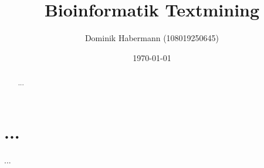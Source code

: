 \documentclass[a4paper,10pt]{article}
\title{Bioinformatik Textmining}
\author{Dominik Habermann (108019250645)}
\date{\today}
\begin{document}
\maketitle

\begin{abstract}
...
\end{abstract}

\section{...}
...
\end{document}

